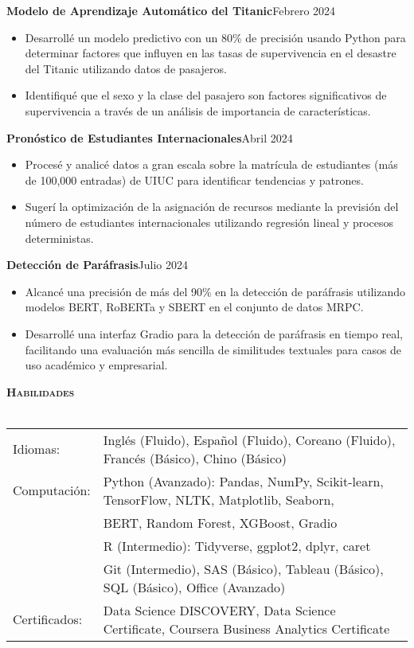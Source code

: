 \documentclass[a4paper]{article}
\newcommand{\lineunder} {
    \vspace*{-8pt} \\
    \hspace*{-18pt} \hrulefill \\
}
\newcommand{\header} [1] {
    {\hspace*{-18pt}\vspace*{6pt} \textsc{#1}}
    \vspace*{-6pt} \lineunder
}
\begin{document}
\textbf{Modelo de Aprendizaje Automático del Titanic}\hfill{Febrero 2024}\\
\begin{itemize}[nolistsep]
    \item Desarrollé un modelo predictivo con un 80\% de precisión usando Python para determinar factores que influyen en las tasas de supervivencia en el desastre del Titanic utilizando datos de pasajeros.
    \item Identifiqué que el sexo y la clase del pasajero son factores significativos de supervivencia a través de un análisis de importancia de características.
\end{itemize}

\textbf{Pronóstico de Estudiantes Internacionales}\hfill{Abril 2024}\\
\begin{itemize}[nolistsep]
    \item Procesé y analicé datos a gran escala sobre la matrícula de estudiantes (más de 100,000 entradas) de UIUC para identificar tendencias y patrones.
    \item Sugerí la optimización de la asignación de recursos mediante la previsión del número de estudiantes internacionales utilizando regresión lineal y procesos deterministas.
\end{itemize}

\textbf{Detección de Paráfrasis}\hfill{Julio 2024}\\
\begin{itemize}[nolistsep]
    \item Alcancé una precisión de más del 90\% en la detección de paráfrasis utilizando modelos BERT, RoBERTa y SBERT en el conjunto de datos MRPC.
    \item Desarrollé una interfaz Gradio para la detección de paráfrasis en tiempo real, facilitando una evaluación más sencilla de similitudes textuales para casos de uso académico y empresarial.
\end{itemize}

\vspace*{1mm}


\header{\textbf{Habilidades}}
\begin{tabular}{ l l }
    Idiomas: & Inglés (Fluido), Español (Fluido), Coreano (Fluido), Francés (Básico), Chino (Básico)              \\
    Computación: & Python (Avanzado): Pandas, NumPy, Scikit-learn, TensorFlow, 
    NLTK, Matplotlib, Seaborn, \\
    & BERT, Random Forest, XGBoost, Gradio\\
    & R (Intermedio): Tidyverse, ggplot2, dplyr, caret\\
    & Git (Intermedio), SAS (Básico), Tableau (Básico), SQL (Básico), Office (Avanzado)\\
    Certificados: & Data Science DISCOVERY, Data Science Certificate, 
    Coursera Business Analytics Certificate
\end{tabular}
\end{document}
